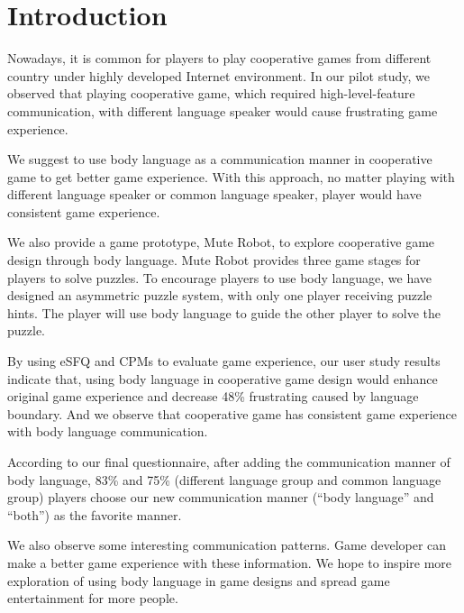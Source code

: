 \section{Introduction}

Nowadays, it is common for players to play cooperative games from different country under highly developed Internet environment. 
In our pilot study, we observed that playing cooperative game, which required high-level-feature communication, with different language speaker would cause frustrating game experience.


We suggest to use body language as a communication manner in cooperative game to get better game experience. With this approach, no matter playing with different language speaker or common language speaker, player would have consistent game experience. 

We also provide a game prototype, Mute Robot, to explore cooperative game design through body language. Mute Robot provides three game stages for players to solve puzzles.
To encourage players to use body language, we have designed an asymmetric puzzle system, with only one player receiving puzzle hints. The player will use body language to guide the other player to solve the puzzle.

By using eSFQ\cite{eSFQ} and CPMs\cite{CPMs} to evaluate game experience, our user study results indicate that, using body language in cooperative game design would enhance original game experience and decrease 48\% frustrating caused by language boundary. And we observe that cooperative game has consistent game experience with body language communication.

According to our final questionnaire, after adding the communication manner of body language, 83\% and 75\% (different language group and common language group) players choose our new communication manner (``body language'' and ``both'') as the favorite manner. 

We also observe some interesting communication patterns. Game developer can make a better game experience with these information. We hope to inspire more exploration of using body language in game designs and spread game entertainment for more people.


